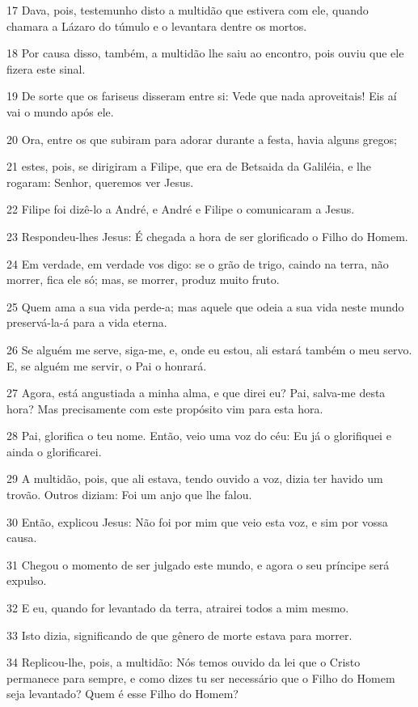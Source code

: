 \par 17 Dava, pois, testemunho disto a multidão que estivera com ele, quando chamara a Lázaro do túmulo e o levantara dentre os mortos.
\par 18 Por causa disso, também, a multidão lhe saiu ao encontro, pois ouviu que ele fizera este sinal.
\par 19 De sorte que os fariseus disseram entre si: Vede que nada aproveitais! Eis aí vai o mundo após ele.
\par 20 Ora, entre os que subiram para adorar durante a festa, havia alguns gregos;
\par 21 estes, pois, se dirigiram a Filipe, que era de Betsaida da Galiléia, e lhe rogaram: Senhor, queremos ver Jesus.
\par 22 Filipe foi dizê-lo a André, e André e Filipe o comunicaram a Jesus.
\par 23 Respondeu-lhes Jesus: É chegada a hora de ser glorificado o Filho do Homem.
\par 24 Em verdade, em verdade vos digo: se o grão de trigo, caindo na terra, não morrer, fica ele só; mas, se morrer, produz muito fruto.
\par 25 Quem ama a sua vida perde-a; mas aquele que odeia a sua vida neste mundo preservá-la-á para a vida eterna.
\par 26 Se alguém me serve, siga-me, e, onde eu estou, ali estará também o meu servo. E, se alguém me servir, o Pai o honrará.
\par 27 Agora, está angustiada a minha alma, e que direi eu? Pai, salva-me desta hora? Mas precisamente com este propósito vim para esta hora.
\par 28 Pai, glorifica o teu nome. Então, veio uma voz do céu: Eu já o glorifiquei e ainda o glorificarei.
\par 29 A multidão, pois, que ali estava, tendo ouvido a voz, dizia ter havido um trovão. Outros diziam: Foi um anjo que lhe falou.
\par 30 Então, explicou Jesus: Não foi por mim que veio esta voz, e sim por vossa causa.
\par 31 Chegou o momento de ser julgado este mundo, e agora o seu príncipe será expulso.
\par 32 E eu, quando for levantado da terra, atrairei todos a mim mesmo.
\par 33 Isto dizia, significando de que gênero de morte estava para morrer.
\par 34 Replicou-lhe, pois, a multidão: Nós temos ouvido da lei que o Cristo permanece para sempre, e como dizes tu ser necessário que o Filho do Homem seja levantado? Quem é esse Filho do Homem?
